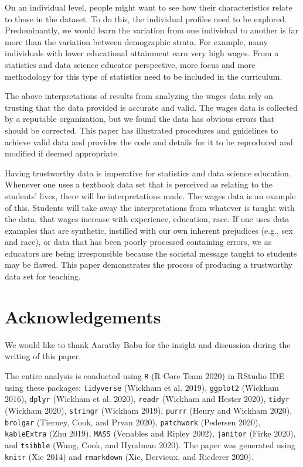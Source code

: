 \documentclass[12pt]{article}
\begin{document}
On an individual level, people might want to see how their characteristics relate to those in the dataset. To do this, the individual profiles need to be explored. Predominantly, we would learn the variation from one individual to another is far more than the variation between demographic strata. For example, many individuals with lower educational attainment earn very high wages. From a statistics and data science educator perspective, more focus and more methodology for this type of statistics need to be included in the curriculum.

The above interpretations of results from analyzing the wages data rely on trusting that the data provided is accurate and valid. The wages data is collected by a reputable organization, but we found the data has obvious errors that should be corrected. This paper has illustrated procedures and guidelines to achieve valid data and provides the code and details for it to be reproduced and modified if deemed appropriate.

Having trustworthy data is imperative for statistics and data science education. Whenever one uses a textbook data set that is perceived as relating to the students' lives, there will be interpretations made. The wages data is an example of this. Students will take away the interpretations from whatever is taught with the data, that wages increase with experience, education, race. If one uses data examples that are synthetic, instilled with our own inherent prejudices (e.g., sex and race), or data that has been poorly processed containing errors, we as educators are being irresponsible because the societal message taught to students may be flawed. This paper demonstrates the process of producing a trustworthy data set for teaching.

\hypertarget{acknowledgements}{%
\section{Acknowledgements}\label{acknowledgements}}

We would like to thank Aarathy Babu for the insight and discussion during the writing of this paper.

The entire analysis is conducted using \texttt{R} (R Core Team 2020) in RStudio IDE using these packages: \texttt{tidyverse} (Wickham et al. 2019), \texttt{ggplot2} (Wickham 2016), \texttt{dplyr} (Wickham et al. 2020), \texttt{readr} (Wickham and Hester 2020), \texttt{tidyr} (Wickham 2020), \texttt{stringr} (Wickham 2019), \texttt{purrr} (Henry and Wickham 2020), \texttt{brolgar} (Tierney, Cook, and Prvan 2020), \texttt{patchwork} (Pedersen 2020), \texttt{kableExtra} (Zhu 2019), \texttt{MASS} (Venables and Ripley 2002), \texttt{janitor} (Firke 2020), and \texttt{tsibble} (Wang, Cook, and Hyndman 2020). The paper was generated using \texttt{knitr} (Xie 2014) and \texttt{rmarkdown} (Xie, Dervieux, and Riederer 2020).
\end{document}
